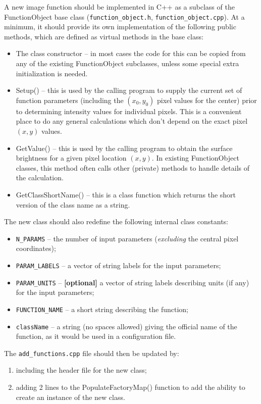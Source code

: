 \documentclass[10pt,a4paper,article]{memoir}
\begin{document}
A new image function should be implemented in C++ as a subclass of
the FunctionObject base class (\texttt{function\_object.h}, \texttt{function\_object.cpp}).
At a minimum, it should provide its own implementation of the following public methods,
which are defined as virtual methods in the base class:
\begin{itemize}
\item The class constructor -- in most cases the code for this can be copied from any of the
existing FunctionObject subclasses, unless some special extra initialization is needed.
\item Setup() -- this is used by the calling program to supply the current set of
function parameters (including the $(x_{0},y_{0})$ pixel values for the center) prior
to determining intensity values for individual pixels. This
is a convenient place to do any general calculations which don't depend on the
exact pixel $(x,y)$ values.
\item GetValue() -- this is used by the calling program to obtain the surface
brightness for a given pixel location $(x,y)$. In existing FunctionObject classes,
this method often calls other (private) methods to handle details of the calculation.
\item GetClassShortName() -- this is a class function which returns
the short version of the class name as a string.

\end{itemize}

The new class should also redefine the following internal class constants:
\begin{itemize}
\item \texttt{N\_PARAMS} -- the number of input parameters (\textit{excluding} the
central pixel coordinates);
\item \texttt{PARAM\_LABELS} -- a vector of string labels for the input parameters;
\item \texttt{PARAM\_UNITS} -- \textbf{[optional]} a vector of string labels 
describing units (if any) for the input parameters;
\item \texttt{FUNCTION\_NAME} -- a short string describing the function;
\item \texttt{className} -- a string (no spaces allowed) giving the official name
of the function, as it would be used in a configuration file.
\end{itemize}

The \texttt{add\_functions.cpp} file should then be updated by:
\begin{enumerate}
\item including the header file for the new class;
\item adding 2 lines to the PopulateFactoryMap() function to add the ability to create an instance of
the new class.
\end{enumerate}
\end{document}
